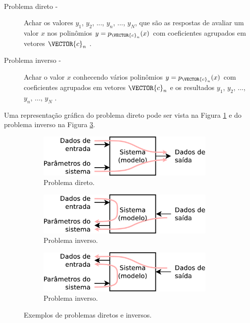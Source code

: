 \begin{example}~
\begin{description}
\item[Problema direto -] Achar os valores $y_1$, $y_2$, ..., $y_n$, ..., $y_N$, 
que são as respostas de avaliar um valor $x$ nos polinômios 
$y=p_{\VECTOR{c}_n}(x)$ com coeficientes agrupados em vetores $\VECTOR{c}_n$ \cite{Keller76}.
\item[Problema inverso -] Achar o valor $x$
conhecendo vários polinômios $y=p_{\VECTOR{c}_n}(x)$ com coeficientes agrupados em vetores $\VECTOR{c}_n$ e
os resultados $y_1$, $y_2$, ..., $y_n$, ..., $y_N$  \cite{Keller76}.
\end{description}
Uma representação gráfica do problema direto pode ser vista na Figura \ref{fig:inverso-diretos:direto1}
e do problema inverso na Figura \ref{fig:inverso-diretos:inverso2}.
\end{example}

\begin{figure}[!h]
     \centering
     \begin{subfigure}[b]{0.49\textwidth}
         \centering
         \includegraphics[width=0.95\textwidth]{chapters/notacao/direto1.eps}
         \caption{Problema direto.}
         \label{fig:inverso-diretos:direto1}
     \end{subfigure}
     \hfill
     \begin{subfigure}[b]{0.49\textwidth}
         \centering
         \includegraphics[width=0.95\textwidth]{chapters/notacao/inverso1.eps}
         \caption{Problema inverso.}
         \label{fig:inverso-diretos:inverso1}
     \end{subfigure}
     \hfill
     \begin{subfigure}[b]{0.49\textwidth}
         \centering
         \includegraphics[width=0.95\textwidth]{chapters/notacao/inverso2.eps}
         \caption{Problema inverso.}
         \label{fig:inverso-diretos:inverso2}
     \end{subfigure}
        \caption{Exemplos de problemas diretos e inversos.}
        \label{fig:inverso-diretos}
\end{figure}

